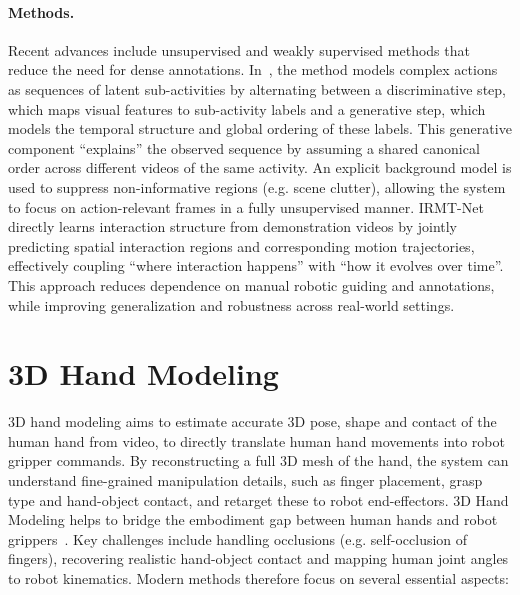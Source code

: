 \paragraph{Methods.}
Recent advances include unsupervised and weakly supervised methods that reduce the need for dense annotations. 
In~\cite{Sener2018UnsupervisedLA}, the method models complex actions as sequences of latent sub-activities by alternating between a discriminative step, which maps visual features to sub-activity labels and a generative step, which models the temporal structure and global ordering of these labels. This generative component ``explains'' the observed sequence by assuming a shared canonical order across different videos of the same activity. An explicit background model is used to suppress non-informative regions (e.g. scene clutter), allowing the system to focus on action-relevant frames in a fully unsupervised manner.
IRMT-Net~\cite{Xin2023LearningIR} directly learns interaction structure from demonstration videos by jointly predicting spatial interaction regions and corresponding motion trajectories, effectively coupling ``where interaction happens'' with ``how it evolves over time''. This approach reduces dependence on manual robotic guiding and annotations, while improving generalization and robustness across real-world settings.



\section{3D Hand Modeling}
3D hand modeling aims to estimate accurate 3D pose, shape and contact of the human hand from video, to directly translate human hand movements into robot gripper commands.
By reconstructing a full 3D mesh of the hand, the system can understand fine-grained manipulation details, such as finger placement, grasp type and hand-object contact, and retarget these to robot end-effectors.
3D Hand Modeling helps to bridge the embodiment gap between human hands and robot grippers~\cite{Shaw2023LEAPHL, Mandikal2022DexVIPLD, Romero2017EmbodiedH}.
Key challenges include handling occlusions (e.g. self-occlusion of fingers), recovering realistic hand-object contact and mapping human joint angles to robot kinematics. Modern methods therefore focus on several essential aspects:

